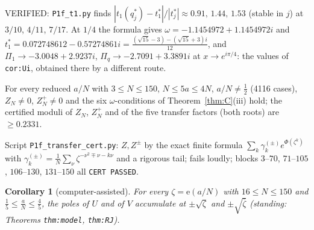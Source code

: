 \documentclass[11pt]{article}
\newtheorem{corollary}[theorem]{Corollary}
\theoremstyle{definition}\newtheorem{definition}[theorem]{Definition}
\theoremstyle{remark}\newtheorem{remark}[theorem]{Remark}
\newcommand{\e}{\mathrm{e}}
\begin{document}
\noindent VERIFIED: \texttt{P1f\_t1.py} finds $|t_1(q^*_j)-t_1^*|/|t^*_j|\approx0.91,\,1.44,\,1.53$ (stable in $j$) at $3/10$, $4/11$, $7/17$. At $1/4$ the formula gives $\omega=-1.1454972+1.1454972i$ and $t_1^*=0.072748612-0.57274861i=\frac{(\sqrt{15}-3)-(\sqrt{15}+3)i}{12}$, and $\Pi_1\to-3.0048+2.9237i$, $\Pi_q\to-2.7091+3.3891i$ at $x\to e^{i\pi/4}$: the values of \texttt{cor:Ui}, obtained there by a different route.

\begin{proposition}\label{prop:cert}
For every reduced $a/N$ with $3\le N\le150$, $N\le5a\le4N$, $a/N\ne\frac12$ (4116 cases), $Z_N\ne0$, $Z^+_N\ne0$ and the six $\omega$-conditions of Theorem~\ref{thm:C}(iii) hold; the certified moduli of $Z_N$, $Z^+_N$ and of the five transfer factors (both roots) are $\ge0.2331$.
\end{proposition}
\noindent Script \texttt{P1f\_transfer\_cert.py}: $Z,Z^\pm$ by the exact finite formula $\sum_k\gamma^{(\pm)}_ke^{\Phi(\zeta^k)}$ with $\gamma^{(\pm)}_k=\frac1N\sum_\nu\zeta^{-\nu^2\mp\nu-k\nu}$ and a rigorous tail; fails loudly; blocks $3$--$70$, $71$--$105$, $106$--$130$, $131$--$150$ all \texttt{CERT PASSED}.

\begin{corollary}[computer-assisted]\label{cor:UV}
For every $\zeta=\e(a/N)$ with $16\le N\le150$ and $\frac15\le\frac aN\le\frac45$, the poles of $U$ and of $V$ accumulate at $\pm\sqrt\zeta$ and $\pm\sqrt{\bar\zeta}$ (standing: Theorems \texttt{thm:model}, \texttt{thm:RJ}).
\end{corollary}
\end{document}
